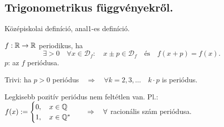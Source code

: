 \documentclass[a4paper,11.5pt]{article}
\begin{document}
	\subsection{Trigonometrikus függvényekről.}
	\begin{revision}
		Középiskolai definíció, anal1-es definíció.
	\end{revision}
	\begin{definition}
		$f:\mathbb{R}\to\mathbb{R}$ periodikus, ha
		\[ \exists>0\quad \forall x\in\mathcal{D}_f:\quad x\pm p\in\mathcal{D}_f\quad \text{és}\quad f(x+p)=f(x). \]
		$p$: az $f$ periódusa.
	\end{definition}
	\begin{note}
		Trivi: ha $p>0$ periódus$\quad \Rightarrow\quad \forall k=2,3,\ldots\quad k\cdot p$ is periódus.
		
		Legkisebb pozitív periódus nem feltétlen van. Pl.: $f(x):=\begin{cases}
		0,\quad x\in\mathbb{Q}\\
		1,\quad x\in\mathbb{Q}^*
		\end{cases}\quad \Rightarrow\quad \forall$ racionális szám periódusa.
	\end{note}
	
	
\end{document}
